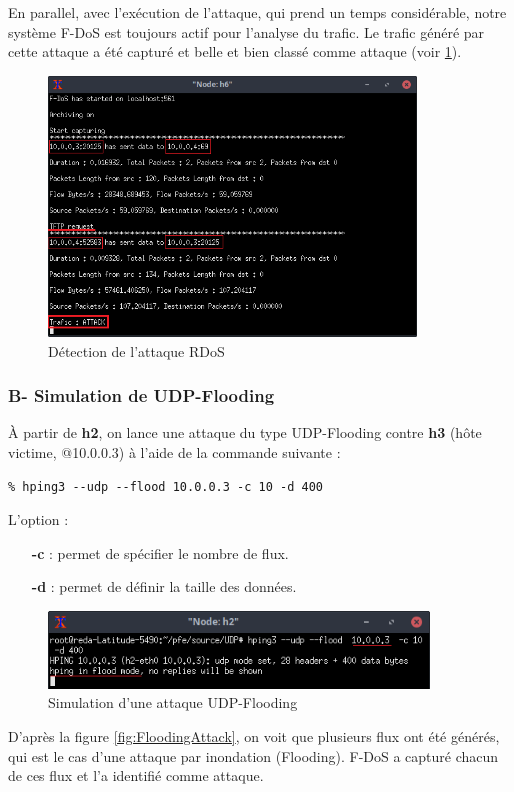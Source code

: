 \noindent En parallel, avec l'exécution de l'attaque, qui prend un temps considérable, notre système F-DoS est toujours actif pour l'analyse du trafic. Le trafic généré par cette attaque a été capturé et belle et bien classé comme attaque (voir \ref{fig:tftpAttack}).
\begin{figure}[h]
\centering
\includegraphics[width=0.87\textwidth]{Figures/simulation/mininet/IDS/attack_tftp}
\decoRule
\caption{Détection de l'attaque RDoS}
\label{fig:tftpAttack}
\end{figure}

\subsubsection{B- Simulation de UDP-Flooding}
À partir de \textbf{h2}, on lance une attaque du type UDP-Flooding contre \textbf{h3} (hôte victime, @10.0.0.3) à l'aide de la commande suivante :
\begin{verbatim}
% hping3 --udp --flood 10.0.0.3 -c 10 -d 400
\end{verbatim}
L'option :
\begin{itemize}
\item[\textbf{-c}]: permet de spécifier le nombre de flux.
\item[\textbf{-d}]: permet de définir la taille des données.
\end{itemize}
\begin{figure}[h]
\centering
\includegraphics[width=0.9\textwidth]{Figures/simulation/mininet/UDP/attack_udp_flood}
\decoRule
\caption{Simulation d'une attaque UDP-Flooding}
\label{fig:FloodingAttackSimulation}
\end{figure}
\newpage
D'après la figure \ref{fig:FloodingAttack}, on voit que plusieurs flux ont été générés, qui est le cas d'une attaque par inondation (Flooding). F-DoS a capturé chacun de ces flux et l'a identifié comme attaque.\\

